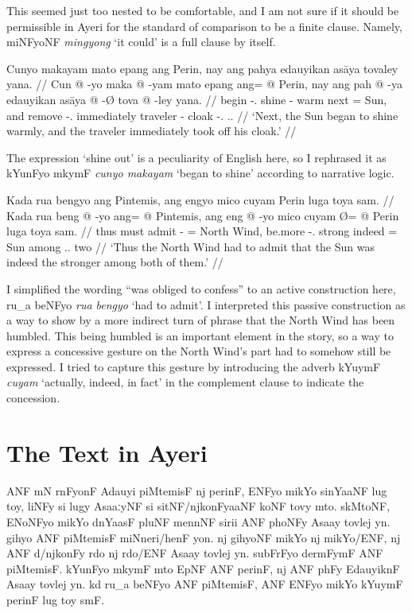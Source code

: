 \documentclass[12pt,paper=a4]{scrartcl}
\newcommand{\xayr}[3]{{\Tagati #1} \emph{#2} \enquote*{#3}}
\newenvironment{ayeri}{
    \doublespacing
    \begin{multicols}{2}
    \Tagati
}{
    \end{multicols} \par
}
\begin{document}
This seemed just too nested to be comfortable, and I am not sure if it should be permissible in Ayeri for the standard of comparison to be a finite clause. Namely, \xayr{miNFyoNF}{mingyong}{it could} is a full clause by itself.

\ex %
\begingl
	\glpreamble Cunyo makayam mato epang ang Perin, nay ang pahya edauyikan asāya tovaley yana. //
	\gla Cun @ -yo maka @ -yam mato epang ang= @ Perin, nay ang pah @ -ya edauyikan asāya @ -Ø tova @ -ley yana. //
	\glb begin -\Tsg{}.\N{} shine -\Ptcp{} warm next \Aarg{}= Sun, and \AgtT{} remove -\Tsg{}.\M{} immediately traveler -\Top{} cloak -\Parg{}.\Inan{} \Tsg{}.\M.\Gen{} //
	\glft `Next, the Sun began to shine warmly, and the traveler immediately took off his cloak.' //
\endgl
\xe

The expression `shine out' is a peculiarity of English here, so I rephrased it as \xayr{kYunFyo mkymF}{cunyo makayam}{began to shine} according to narrative logic.

\ex %
\begingl
	\glpreamble Kada rua bengyo ang Pintemis, ang engyo mico cuyam Perin luga toya sam. //
	\gla Kada rua beng @ -yo ang= @ Pintemis, ang eng @ -yo mico cuyam  Ø= @ Perin luga toya sam. //
	\glb thus must admit -\Tsg{} \Aarg{}= {North Wind}, \AgtT{} be.more -\Tsg{}.\N{} strong indeed \Top{}= Sun among \Tpl{}.\N{}.\Loc{} two //
	\glft `Thus the North Wind had to admit that the Sun was indeed the stronger among both of them.' //
\endgl
\xe

I simplified the wording \enquote{was obliged to confess} to an active construction here, \xayr{ru\_a beNFyo}{rua bengyo}{had to admit}. I interpreted this passive construction as a way to show by a more indirect turn of phrase that the North Wind has been humbled. This being humbled is an important element in the story, so a way to express a concessive gesture on the North Wind's part had to somehow still be expressed. I tried to capture this gesture by introducing the adverb \xayr{kYuymF}{cuyam}{actually, indeed, in fact} in the complement clause to indicate the concession.

\section{The Text in Ayeri}

\begin{ayeri}
\noindent ANF mN rnFyonF Adauyi piMtemisF nj perinF, ENFyo mikYo sinYaaNF lug toy, liNFy si lugy AsaaːyNF si sitNF/njkonFyaaNF koNF tovy mto.
skMtoNF, ENoNFyo mikYo dnYaasF pluNF mennNF sirii ANF phoNFy Asaay tovlej yn.
gihyo ANF piM\-temisF miNneri/henF yon.
nj gihyoNF mikYo nj mikYo/ENF, nj ANF d/njkonFy rdo nj rdo/ENF Asaay tovlej yn.
su\-bFrFyo dermFymF ANF piMtemisF.
kYunFyo mkymF mto EpNF ANF perinF, nj ANF phFy EdauyiknF Asaay tovlej yn.
kd ru\_a beNFyo ANF piMtemisF, ANF ENFyo mikYo kYuymF perinF lug toy smF.
\end{ayeri}
\end{document}

